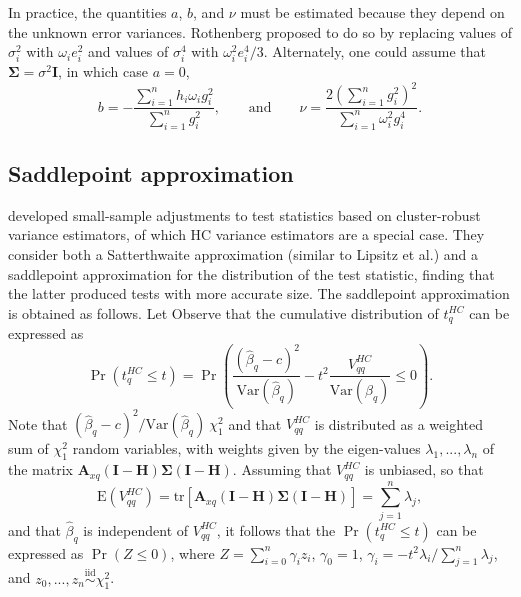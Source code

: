 \documentclass[12pt]{article}\usepackage[]{graphicx}\usepackage[]{color}
\newcommand{\E}{\text{E}}
\newcommand{\Var}{\text{Var}}
\newcommand{\tr}{\text{tr}}
\newcommand{\iid}{\stackrel{\text{iid}}{\sim}}
\newcommand{\bm}{\mathbf}
\newcommand{\bs}{\boldsymbol}
\begin{document}
In practice, the quantities $a$, $b$, and $\nu$ must be estimated because they depend on the unknown error variances. 
Rothenberg proposed to do so by replacing values of $\sigma_i^2$ with $\omega_i e_i^2$ and values of $\sigma_i^4$ with $\omega_i^2 e_i^4 / 3$. 
Alternately, one could assume that $\bs\Sigma = \sigma^2 \bm{I}$, in which case $a = 0$, 
\[
b = - \frac{\sum_{i=1}^n h_i \omega_i g_i^2}{\sum_{i=1}^n g_i^2}, \qquad \text{and} \qquad 
\nu = \frac{2\left(\sum_{i=1}^n g_i^2 \right)^2}{\sum_{i=1}^n \omega_i^2 g_i^4}.
\]

\subsection{Saddlepoint approximation}

\citet{McCaffrey2006improved} developed small-sample adjustments to test statistics based on cluster-robust variance estimators, of which HC variance estimators are a special case. They consider both a Satterthwaite approximation (similar to Lipsitz et al.) and a saddlepoint approximation for the distribution of the test statistic, finding that the latter produced tests with more accurate size. The saddlepoint approximation is obtained as follows. Let Observe that the cumulative distribution of $t^{HC}_q$ can be expressed as \[
\Pr\left(t^{HC}_q \leq t\right) = \Pr\left(\frac{\left(\hat\beta_q - c\right)^2}{\Var(\hat\beta_q)} - t^2 \frac{V^{HC}_{qq}}{\Var(\hat\beta_q)} \leq 0\right). \]
Note that $\left(\hat\beta_q - c\right)^2 / \Var(\hat\beta_q) ~ \chi^2_1$ and that $V^{HC}_{qq}$ is distributed as a weighted sum of $\chi^2_1$ random variables, with weights given by the eigen-values $\lambda_1,...,\lambda_n$ of the matrix $\bm{A}_{xq} \left(\bm{I} - \bm{H}\right)\bs\Sigma\left(\bm{I} - \bm{H}\right)$. Assuming that $V^{HC}_{qq}$ is unbiased, so that \[
\E\left(V^{HC}_{qq}\right) = \tr\left[\bm{A}_{xq} \left(\bm{I} - \bm{H}\right)\bs\Sigma\left(\bm{I} - \bm{H}\right)\right] = \sum_{j=1}^n \lambda_j, \]
and that $\hat\beta_q$ is independent of $V^{HC}_{qq}$, it follows that the $\Pr\left(t^{HC}_q \leq t\right)$ can be expressed as $\Pr(Z \leq 0)$, where $Z = \sum_{i=0}^n \gamma_i z_i$,
$\gamma_0 = 1$, $\gamma_i = -t^2 \lambda_i / \sum_{j=1}^n \lambda_j$, and $z_0,...,z_n \iid \chi^2_1$.
\end{document}
